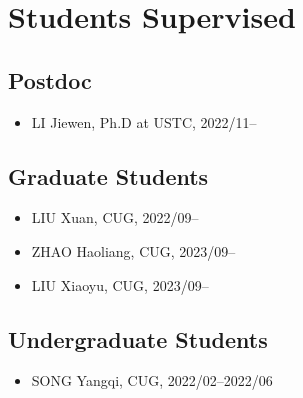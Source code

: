 \section{Students Supervised}

\subsection{Postdoc}
\begin{itemize}
\item LI Jiewen, Ph.D at USTC, 2022/11--
\end{itemize}

\subsection{Graduate Students}
\begin{itemize}
\item LIU Xuan, CUG, 2022/09--
\item ZHAO Haoliang, CUG, 2023/09--
\item LIU Xiaoyu, CUG, 2023/09--
\end{itemize}

\subsection{Undergraduate Students}
\begin{itemize}
\item SONG Yangqi, CUG, 2022/02--2022/06
\end{itemize}
